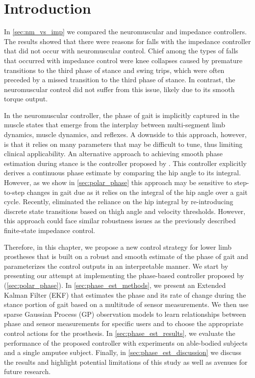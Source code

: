 \section{Introduction}\label{sec:phase_est_intro}

In \cref{sec:nm_vs_imp} we compared the neuromuscular and impedance controllers.
The results showed that there were reasons for falls with the impedance
controller that did not occur with neuromuscular control. Chief among the types
of falls that occurred with impedance control were knee collapses caused by
premature transitions to the third phase of stance and swing trips, which were
often preceded by a missed transition to the third phase of stance. In contrast,
the neuromuscular control did not suffer from this issue, likely due to its
smooth torque output.

In the neuromuscular controller, the phase of gait is implicitly captured in the
muscle states that emerge from the interplay between multi-segment limb
dynamics, muscle dynamics, and reflexes. A downside to this approach, however,
is that it relies on many parameters that may be difficult to tune, thus
limiting clinical applicability. An alternative approach to achieving smooth
phase estimation during stance is the controller proposed by
\citet{quintero2016preliminary}. This controller explicitly derives a continuous
phase estimate by comparing the hip angle to its integral. However, as we show
in \cref{sec:polar_phase} this approach may be sensitive to step-to-step changes
in gait due as it relies on the integral of the hip angle over a gait cycle.
Recently, \citet{rezazadeh2018phase} eliminated the reliance on the hip integral
by re-introducing discrete state transitions based on thigh angle and velocity
thresholds. However, this approach could face similar robustness issues as the
previously described finite-state impedance control.

Therefore, in this chapter, we propose a new control strategy for lower limb
prostheses that is built on a robust and smooth estimate of the phase of gait
and parameterizes the control outputs in an interpretable manner. We start by
presenting our attempt at implementing the phase-based controller proposed by
\citet{quintero2016preliminary} (\cref{sec:polar_phase}). In
\cref{sec:phase_est_methods}, we present an Extended Kalman Filter (EKF) that
estimates the phase and its rate of change during the stance portion of gait
based on a multitude of sensor measurements.  We then use sparse Gaussian
Process (GP) observation models to learn relationships between phase and sensor
measurements for specific users and to choose the appropriate control actions
for the prosthesis. In \cref{sec:phase_est_results}, we evaluate the performance
of the proposed controller with experiments on able-bodied subjects and a single
amputee subject. Finally, in \cref{sec:phase_est_discussion} we discuss the
results and highlight potential limitations of this study as well as avenues for
future research.
